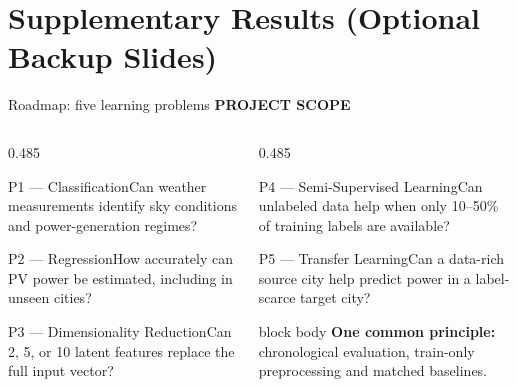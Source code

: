 \documentclass[aspectratio=169,11pt]{beamer}
\newcommand{\sectiontag}[1]{{\footnotesize\usebeamercolor[fg]{structure}\textbf{#1}}\par\vspace{0.10cm}}
\begin{document}
\section{Supplementary Results (Optional Backup Slides)}
\begin{frame}{Roadmap: five learning problems}
\sectiontag{PROJECT SCOPE}
\vspace{-0.12cm}
\begin{columns}[T,totalwidth=\textwidth]
\begin{column}{0.485\textwidth}
\begin{block}{P1 — Classification}Can weather measurements identify sky conditions and power-generation regimes?\end{block}
\begin{block}{P2 — Regression}How accurately can PV power be estimated, including in unseen cities?\end{block}
\begin{block}{P3 — Dimensionality Reduction}Can 2, 5, or 10 latent features replace the full input vector?\end{block}
\end{column}
\begin{column}{0.485\textwidth}
\begin{block}{P4 — Semi-Supervised Learning}Can unlabeled data help when only 10--50\% of training labels are available?\end{block}
\begin{block}{P5 — Transfer Learning}Can a data-rich source city help predict power in a label-scarce target city?\end{block}
\vspace{0.15cm}
\begin{beamercolorbox}[rounded=true,sep=0.20cm]{block body}
\textbf{One common principle:} chronological evaluation, train-only preprocessing and matched baselines.
\end{beamercolorbox}
\end{column}
\end{columns}
\end{frame}

\end{document}
